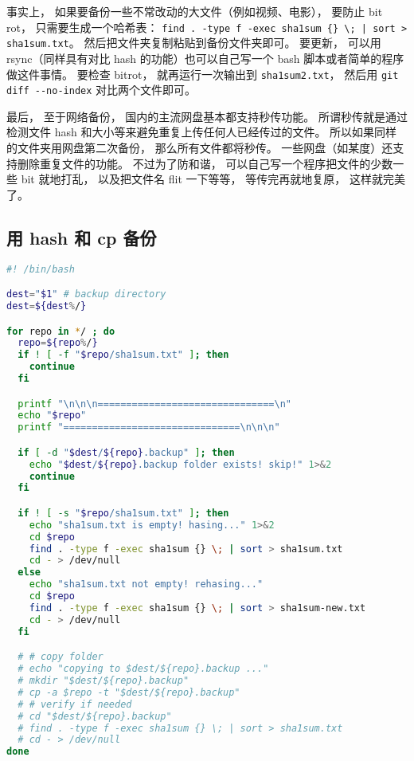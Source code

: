 
\begin{issues}
\issueDraft
\end{issues}


事实上， 如果要备份一些不常改动的大文件（例如视频、电影）， 要防止 bit rot， 只需要生成一个哈希表： \verb`find . -type f -exec sha1sum {} \; | sort > sha1sum.txt`。 然后把文件夹复制粘贴到备份文件夹即可。 要更新， 可以用 rsync（同样具有对比 hash 的功能）也可以自己写一个 bash 脚本或者简单的程序做这件事情。 要检查 bitrot， 就再运行一次输出到 \verb`sha1sum2.txt`， 然后用 \verb`git diff --no-index` 对比两个文件即可。

最后， 至于网络备份， 国内的主流网盘基本都支持秒传功能。 所谓秒传就是通过检测文件 hash 和大小等来避免重复上传任何人已经传过的文件。 所以如果同样的文件夹用网盘第二次备份， 那么所有文件都将秒传。 一些网盘（如某度）还支持删除重复文件的功能。 不过为了防和谐， 可以自己写一个程序把文件的少数一些 bit 就地打乱， 以及把文件名 flit 一下等等， 等传完再就地复原， 这样就完美了。

\subsection{用 hash 和 cp 备份}

\begin{lstlisting}[language=bash]
#! /bin/bash

dest="$1" # backup directory
dest=${dest%/}

for repo in */ ; do
  repo=${repo%/}
  if ! [ -f "$repo/sha1sum.txt" ]; then
    continue
  fi

  printf "\n\n\n===============================\n"
  echo "$repo"
  printf "===============================\n\n\n"

  if [ -d "$dest/${repo}.backup" ]; then
    echo "$dest/${repo}.backup folder exists! skip!" 1>&2
    continue
  fi

  if ! [ -s "$repo/sha1sum.txt" ]; then
    echo "sha1sum.txt is empty! hasing..." 1>&2
    cd $repo
    find . -type f -exec sha1sum {} \; | sort > sha1sum.txt
    cd - > /dev/null
  else
    echo "sha1sum.txt not empty! rehasing..."
    cd $repo
    find . -type f -exec sha1sum {} \; | sort > sha1sum-new.txt
    cd - > /dev/null
  fi

  # # copy folder
  # echo "copying to $dest/${repo}.backup ..."
  # mkdir "$dest/${repo}.backup"
  # cp -a $repo -t "$dest/${repo}.backup"
  # # verify if needed
  # cd "$dest/${repo}.backup"
  # find . -type f -exec sha1sum {} \; | sort > sha1sum.txt
  # cd - > /dev/null
done
\end{lstlisting}

